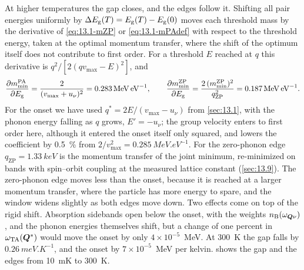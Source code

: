 At higher temperatures the gap closes, and the edges follow it. Shifting all pair energies uniformly by $\Delta E_{\mathrm{g}}(T) = E_{\mathrm{g}}(T) - E_{\mathrm{g}}(0)$ moves each threshold mass by the derivative of \cref{eq:13.1-mZP} or \cref{eq:13.1-mPAdef} with respect to the threshold energy, taken at the optimal momentum transfer, where the shift of the optimum itself does not contribute to first order. For a threshold $E$ reached at $q$ this derivative is $q^2/[2(qv_{\mathrm{max}} - E)^2]$, and
\begin{equation}
  \frac{\partial m_{\mathrm{min}}^{\mathrm{PA}}}{\partial E_{\mathrm{g}}} = \frac{2}{(v_{\mathrm{max}} + u_\nu)^2} = \SI{0.283}{MeV.eV^{-1}} , \qquad
  \frac{\partial m_{\mathrm{min}}^{\mathrm{ZP}}}{\partial E_{\mathrm{g}}} = \frac{2\,(m_{\mathrm{min}}^{\mathrm{ZP}})^2}{q_{\mathrm{ZP}}^2} = \SI{0.187}{MeV.eV^{-1}} .
  \label{eq:13.7-dm}
\end{equation}
For the onset we have used $q^* = 2E/(v_{\mathrm{max}} - u_\nu)$ from \cref{sec:13.1}, with the phonon energy falling as $q$ grows, $E' = -u_\nu$; the group velocity enters to first order here, although it entered the onset itself only squared, and lowers the coefficient by \SI{0.5}{\percent} from $2/v_{\mathrm{max}}^2 = \SI{0.285}{MeV.eV^{-1}}$. For the zero-phonon edge $q_{\mathrm{ZP}} = \SI{1.33}{keV}$ is the momentum transfer of the joint minimum, re-minimized on bands with spin--orbit coupling at the measured lattice constant (\cref{sec:13.9}). The zero-phonon edge moves less than the onset, because it is reached at a larger momentum transfer, where the particle has more energy to spare, and the window widens slightly as both edges move down. Two effects come on top of the rigid shift. Absorption sidebands open below the onset, with the weights $n_{\mathrm{B}}(\omega_{\bm{Q}\nu})$, and the phonon energies themselves shift, but a change of one percent in $\omega_{\mathrm{TA}}(\bm{Q}^*)$ would move the onset by only $4\times10^{-5}$~MeV. At \SI{300}{K} the gap falls by $\SI{0.26}{meV.K^{-1}}$, and the onset by $7\times10^{-5}$~MeV per kelvin.  shows the gap and the edges from \SI{10}{mK} to \SI{300}{K}.

